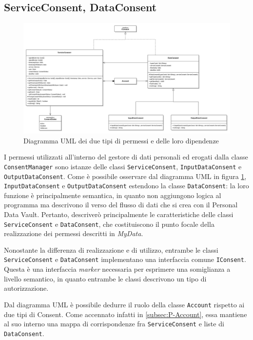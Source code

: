 \subsection{ServiceConsent, DataConsent}
\label{subsec:P-ServiceConsentDataConsent}
\begin{figure} [h]
	\includegraphics[width=\linewidth]{pictures/Auth-Consents.png}
	\caption{Diagramma UML dei due tipi di permessi e delle loro dipendenze}
	\label{fig:Auth-Consents}
\end{figure}
I permessi utilizzati all’interno del gestore di dati personali ed erogati dalla classe \texttt{ConsentManager} sono istanze delle classi \texttt{ServiceConsent}, \texttt{InputDataConsent} e \texttt{OutputDataConsent}. Come \`e possibile osservare dal diagramma UML in figura \ref{fig:Auth-Consents}, \texttt{InputDataConsent} e \texttt{OutputDataConsent} estendono la classe \texttt{DataConsent}: la loro funzione \`e principalmente semantica, in quanto non aggiungono logica al programma ma descrivono il verso del flusso di dati che si crea con il Personal Data Vault. Pertanto, descriver\`o principalmente le caratteristiche delle classi \texttt{ServiceConsent} e \texttt{DataConsent}, che costituiscono il punto focale della realizzazione dei permessi descritti in \textit{MyData}.

Nonostante la differenza di realizzazione e di utilizzo, entrambe le classi \texttt{ServiceConsent} e \texttt{DataConsent} implementano una interfaccia comune \texttt{IConsent}. Questa \`e una interfaccia \textit{marker} necessaria per esprimere una somiglianza a livello semantico, in quanto entrambe le classi descrivono un tipo di autorizzazione.

Dal diagramma UML \`e possibile dedurre il ruolo della classe \texttt{Account} rispetto ai due tipi di Consent. Come accennato infatti in \ref{subsec:P-Account}, essa mantiene al suo interno una mappa di corrispondenze fra \texttt{ServiceConsent} e liste di \texttt{DataConsent}.

